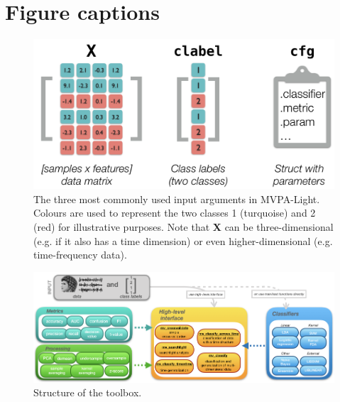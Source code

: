 \documentclass[utf8]{frontiersSCNS} %
\begin{document}



\section*{Figure captions}


\begin{figure}[ht!]
\centering\includegraphics[width=.6\linewidth]{X_clabel_cfg}
\caption{The three most commonly used input arguments in MVPA-Light. Colours are used to represent the two classes 1 (turquoise) and 2 (red) for illustrative purposes. Note that \textbf{X} can be three-dimensional (e.g. if it also has a time dimension) or even higher-dimensional (e.g. time-frequency data).}\label{fig:X}
\end{figure}

\begin{figure}[ht!]
\centering\includegraphics[width=\linewidth]{fig1_MVPA_structure}
\caption{Structure of the toolbox.}\label{fig:structure}
\end{figure}
\end{document}
